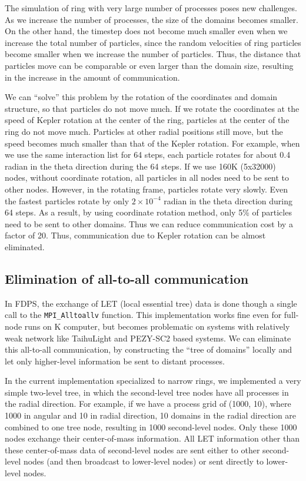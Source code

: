 \documentclass[Afour,sageh,times]{sagej}
\newcommand{\rev}[1]{{#1}}
\begin{document}
The simulation of ring with very large number of processes poses new
challenges. As we increase the number of processes, the size of the
domains becomes smaller. On the other hand, the timestep does not
become much smaller even when we increase the total number of
particles, since the random velocities of ring particles become
smaller when we increase the number of particles. Thus, the distance
that particles move can be comparable or even larger than the domain
size, resulting in the increase in the amount of communication.

We can ``solve'' this problem by the rotation of the coordinates and
domain structure, so that particles do not move much. If we rotate the
coordinates at the speed of Kepler rotation at the center of the ring,
particles at the center of the ring do not move much. Particles at
other radial positions still move, but the speed becomes much smaller
than that of the Kepler rotation. \rev{For example, when we use the
  same interaction list for 64 steps, each particle rotates for about
  0.4 radian in the theta direction during the 64 steps. If we use
  160K (5x32000) nodes, without coordinate rotation, all particles in
  all nodes need to be sent to other nodes. However, in the rotating
  frame, particles rotate very slowly. Even the fastest particles
  rotate by only $2 \times 10^{-4}$ radian in the theta direction
  during 64 steps. As a result, by using coordinate rotation method,
  only 5\% of particles need to be sent to other domains. Thus we can
  reduce communication cost by a factor of 20.}  Thus, communication
due to Kepler rotation can be almost eliminated.


\subsection{Elimination of all-to-all communication}
\label{subsec:exlet}

In FDPS, the exchange of LET (local essential tree) data is done
though a single call to the {\tt MPI\_Alltoallv} function.  This
implementation works fine even for full-node runs on K computer, but
becomes problematic on systems with relatively weak network like
TaihuLight and PEZY-SC2 based systems. We can eliminate this
all-to-all communication, by constructing the ``tree of domains''
locally and let only higher-level information be sent to distant
processes.

In the current implementation specialized to narrow rings, we
implemented a very simple two-level tree, in which the second-level
tree nodes have all processes in the radial direction. For example, if
we have a process grid of (1000, 10), where 1000 in angular and 10 in
radial direction, 10 domains in the radial direction are combined to
one tree node, resulting in 1000 second-level nodes. Only these 1000
nodes exchange their center-of-mass information. All LET information
other than these center-of-mass data of second-level nodes are sent
either to other second-level nodes (and then broadcast to lower-level
nodes) or sent directly to lower-level nodes.
\end{document}
